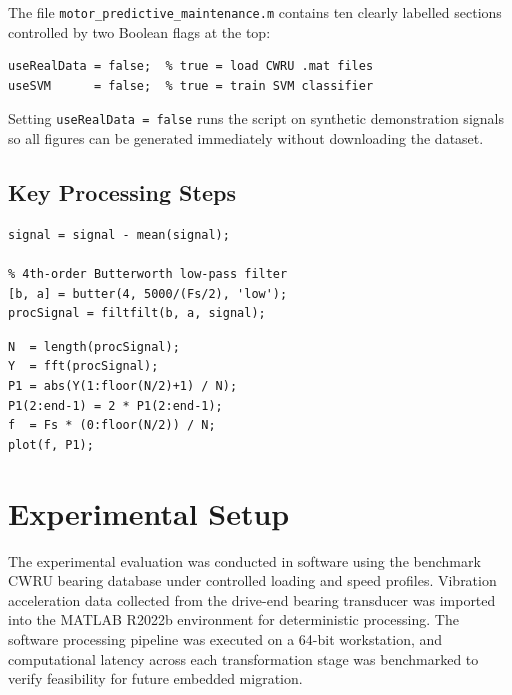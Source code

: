 \documentclass[12pt,a4paper]{article}
\begin{document}
The file \texttt{motor\_predictive\_maintenance.m} contains ten
clearly labelled sections controlled by two Boolean flags at the top:

\begin{lstlisting}[caption={User-configurable flags}]
useRealData = false;  % true = load CWRU .mat files
useSVM      = false;  % true = train SVM classifier
\end{lstlisting}

Setting \texttt{useRealData = false} runs the script on synthetic
demonstration signals so all figures can be generated immediately
without downloading the dataset.

\subsection{Key Processing Steps}

\begin{lstlisting}[caption={DC removal and Butterworth LPF}]
% DC removal
signal = signal - mean(signal);

% 4th-order Butterworth low-pass filter
[b, a] = butter(4, 5000/(Fs/2), 'low');
procSignal = filtfilt(b, a, signal);
\end{lstlisting}

\begin{lstlisting}[caption={FFT and single-sided spectrum}]
N  = length(procSignal);
Y  = fft(procSignal);
P1 = abs(Y(1:floor(N/2)+1) / N);
P1(2:end-1) = 2 * P1(2:end-1);
f  = Fs * (0:floor(N/2)) / N;
plot(f, P1);
\end{lstlisting}

\section{Experimental Setup}

The experimental evaluation was conducted in software using the benchmark
CWRU bearing database under controlled loading and speed profiles.
Vibration acceleration data collected from the drive-end bearing transducer
was imported into the MATLAB R2022b environment for deterministic processing.
The software processing pipeline was executed on a 64-bit workstation, and
computational latency across each transformation stage was benchmarked to
verify feasibility for future embedded migration.
\end{document}

